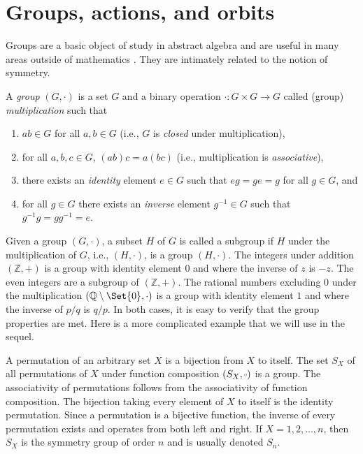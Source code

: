 \chapter{\label{app:def}Groups, actions, and orbits}
\setcounter{example}{0}

Groups are a basic object of study in abstract algebra and
are useful in many areas outside of mathematics \cite{armstrong1997groups, dummit2003abstract, lang2002algebra}.  They are intimately
related to the notion of symmetry.

\begin{definition}
A \emph{group} $(G, \cdot)$ is a set $G$ and a binary operation $\cdot: G \times G \to G$
called (group) \emph{multiplication} such that
\begin{enumerate}
\item $ab \in G$ for all $a, b \in G$ (i.e., $G$ is \emph{closed} under multiplication),
\item for all $a, b, c \in G$, $(ab)c = a(bc)$ (i.e., multiplication is \emph{associative}),
\item there exists an \emph{identity} element $e \in G$ such that $eg = ge = g$ for all $g \in G$, and
\item for all $g \in G$ there exists an \emph{inverse} element $g^{-1} \in G$ such that $g^{-1}g = gg^{-1} = e$.
\end{enumerate}
\end{definition}

Given a group $(G, \cdot)$, a subset $H$ of $G$ is called a subgroup if $H$
under the multiplication of $G$, i.e., $(H, \cdot)$, is a group $(H, \cdot)$.  The integers under
addition $(\mathbb{Z}, +)$ is a group with identity element $0$ and where the
inverse of $z$ is $-z$.  The even integers are a subgroup of $(\mathbb{Z}, +)$.
The rational numbers excluding $0$ under the multiplication
$(\mathbb{Q}\setminus \Set{0}, \cdot)$ is a group with identity element $1$ and
where the inverse of $p/q$ is $q/p$. In both cases, it is easy to verify that
the group properties are met.  Here is a more complicated example that we will
use in the sequel. 

\begin{example}
A permutation of an arbitrary set $X$ is a bijection from $X$ to itself.  The
set $S_X$ of all permutations of $X$ under function composition
$(S_X, \smallcirc)$ is a group.  The associativity of permutations follows from the
associativity of function composition.  The bijection taking every element of
$X$ to itself is the identity permutation. Since a permutation is a bijective function, the
inverse of every permutation exists and operates from both left and right.  
If $X = {1, 2, \dots, n}$, then $S_X$ is the symmetry group of order $n$
and is usually denoted $S_n$.
\end{example}


